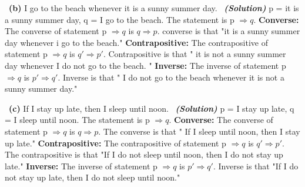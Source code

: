 \documentclass[a4 paper]{article}
\numberwithin{equation}{section}
\newcommand{\subproblem}[1]{~\newline\textbf{(#1)}}
\newcommand{\solution}{~\newline\textbf{\textit{(Solution)}} }
\newcommand{\0}{\mathbf{0}}
\begin{document}
\subproblem{b} I go to the beach whenever it is a sunny summer day.
\solution
\newline
p = it is a sunny summer day, q = I go to the beach.
\newline
The statement is p $\Rightarrow q.$
\newline
\textbf{Converse:}
\newline
The converse of statement p $\Rightarrow q$ is $ q\Rightarrow p.$
\newline
converse is that "it is a sunny summer day whenever i go to the beach."
\newline
\textbf{Contrapositive:}
\newline
The contrapositive of statement p $\Rightarrow q$ is $q' \Rightarrow p'.$
Contrapositive is that " it is not a sunny summer day whenever I do not go to the beach. " 
\newline
\textbf{Inverse:}
\newline
The inverse of statement p $\Rightarrow q$ is $p'\Rightarrow q'.$
\newline
Inverse is that " I do not go to the beach whenever it is not a sunny summer day."
\newline
\newline


\subproblem{c} If I stay up late, then I sleep until
noon.
\solution
\newline
p = I stay up late, q = I sleep until noon.
\newline
The statement is p $\Rightarrow q.$
\newline
\textbf{Converse:}
\newline
The converse of statement p $\Rightarrow q$ is $q\Rightarrow p.$
\newline
The converse is that " If I sleep until noon, then I stay up late."
\newline
\textbf{Contrapositive:}
\newline
The contrapositive of statement p $\Rightarrow q$ is $q' \Rightarrow p'.$
\newline
The contrapositive is that "If I do not sleep until noon, then I do not stay up late."
\newline
\textbf{Inverse:}
\newline
The inverse of statement p $\Rightarrow q$ is $p'\Rightarrow q'.$
\newline
Inverse is that "If I do not stay up late, then I do not sleep until noon."
\newline
\end{document}
